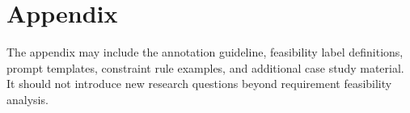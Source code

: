 \section{Appendix}
\label{appendix}

The appendix may include the annotation guideline, feasibility label definitions, prompt templates, constraint rule examples, and additional case study material.
It should not introduce new research questions beyond requirement feasibility analysis.
